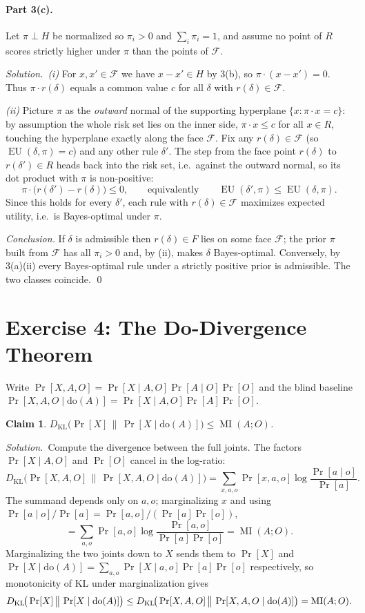\documentclass[11pt]{article}
\newcommand{\rd}{r(\delta)}
\newcommand{\DKL}{D_{\mathrm{KL}}}
\DeclareMathOperator{\MI}{MI}
\DeclareMathOperator{\EU}{EU}
\newcommand{\doo}[1]{\mathrm{do}(#1)}
\theoremstyle{plain}
\newtheorem*{claim}{Claim}
\newcommand{\soln}{\medskip\noindent\textit{Solution.}\ }
\begin{document}
\paragraph{Part 3(c).} Let $\pi\perp H$ be normalized so $\pi_i>0$ and $\sum_i\pi_i=1$, and assume no point of $R$ scores strictly higher under $\pi$ than the points of $\mathcal F$.

\soln \emph{(i)} For $x,x'\in\mathcal F$ we have $x-x'\in H$ by 3(b), so $\pi\cdot(x-x')=0$. Thus $\pi\cdot\rd$ equals a common value $c$ for all $\delta$ with $\rd\in\mathcal F$.

\emph{(ii)} Picture $\pi$ as the \emph{outward} normal of the supporting hyperplane $\{x:\pi\cdot x=c\}$: by assumption the whole risk set lies on the inner side, $\pi\cdot x\le c$ for all $x\in R$, touching the hyperplane exactly along the face $\mathcal F$. Fix any $\rd\in\mathcal F$ (so $\EU(\delta,\pi)=c$) and any other rule $\delta'$. The step from the face point $\rd$ to $r(\delta')\in R$ heads back into the risk set, i.e.\ against the outward normal, so its dot product with $\pi$ is non-positive:
\[
  \pi\cdot\big(r(\delta')-\rd\big)\le 0,\qquad\text{equivalently}\qquad \EU(\delta',\pi)\le\EU(\delta,\pi).
\]
Since this holds for every $\delta'$, each rule with $\rd\in\mathcal F$ maximizes expected utility, i.e.\ is Bayes-optimal under $\pi$.

\emph{Conclusion.} If $\delta$ is admissible then $\rd\in F$ lies on some face $\mathcal F$; the prior $\pi$ built from $\mathcal F$ has all $\pi_i>0$ and, by (ii), makes $\delta$ Bayes-optimal. Conversely, by 3(a)(ii) every Bayes-optimal rule under a strictly positive prior is admissible. The two classes coincide. \qed

\section{Exercise 4: The Do-Divergence Theorem}

Write $\Pr[X,A,O]=\Pr[X\mid A,O]\Pr[A\mid O]\Pr[O]$ and the blind baseline $\Pr[X,A,O\mid\doo{A}]=\Pr[X\mid A,O]\Pr[A]\Pr[O]$.

\begin{claim}
$\DKL\!\big(\Pr[X]\,\big\|\,\Pr[X\mid\doo{A}]\big)\le\MI(A;O)$.
\end{claim}

\soln Compute the divergence between the full joints. The factors $\Pr[X\mid A,O]$ and $\Pr[O]$ cancel in the log-ratio:
\[
  \DKL\!\big(\Pr[X,A,O]\,\big\|\,\Pr[X,A,O\mid\doo{A}]\big)
  =\sum_{x,a,o}\Pr[x,a,o]\log\frac{\Pr[a\mid o]}{\Pr[a]}.
\]
The summand depends only on $a,o$; marginalizing $x$ and using $\Pr[a\mid o]/\Pr[a]=\Pr[a,o]/(\Pr[a]\Pr[o])$,
\[
  =\sum_{a,o}\Pr[a,o]\log\frac{\Pr[a,o]}{\Pr[a]\Pr[o]}=\MI(A;O).
\]
Marginalizing the two joints down to $X$ sends them to $\Pr[X]$ and $\Pr[X\mid\doo{A}]=\sum_{a,o}\Pr[X\mid a,o]\Pr[a]\Pr[o]$ respectively, so monotonicity of KL under marginalization gives
\[
  \DKL\!\big(\Pr[X]\,\big\|\,\Pr[X\mid\doo{A}]\big)\le\DKL\!\big(\Pr[X,A,O]\,\big\|\,\Pr[X,A,O\mid\doo{A}]\big)=\MI(A;O). \qedhere
\]
\end{document}
